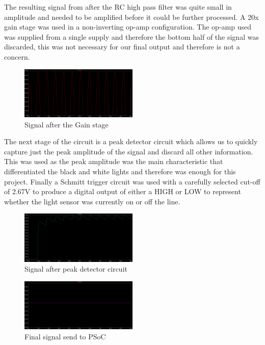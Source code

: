 \documentclass{article}
\begin{document}
The resulting signal from after the RC high pass filter was quite small in amplitude and needed to be amplified before it could be further processed. A 20x gain stage was used in a non-inverting op-amp configuration. The op-amp used was supplied from a single supply and therefore the bottom half of the signal was discarded, this was not necessary for our final output and therefore is not a concern.

\begin{figure}[!h]
\centerline{\includegraphics[width=0.5\textwidth]{stage_3}}
\caption{Signal after the Gain stage}
\label{fig:stage3}
\end{figure}

The next stage of the circuit is a peak detector circuit which allows us to quickly capture just the peak amplitude of the signal and discard all other information. This was used as the peak amplitude was the main characteristic that differentiated the black and white lights and therefore was enough for this project. Finally a Schmitt trigger circuit was used with a carefully selected cut-off of 2.67V to produce a digital output of either a HIGH or LOW to represent whether the light sensor was currently on or off the line.

\begin{figure}[!h]
\centerline{\includegraphics[width=0.5\textwidth]{stage_4}}
\caption{Signal after peak detector circuit}
\label{fig:stage4}
\end{figure}

\begin{figure}[!h]
\centerline{\includegraphics[width=0.5\textwidth]{stage_5}}
\caption{Final signal send to PSoC}
\label{fig:stage5}
\end{figure}
\end{document}
